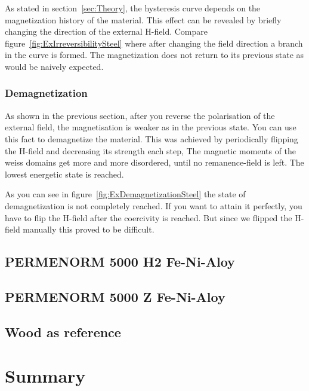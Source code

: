 \documentclass[a4paper,10pt,twocolumn]{article}
\begin{document}
    
    As stated in section~\ref{sec:Theory}, the hysteresis curve depends on the magnetization history
    of the material. 
    This effect can be revealed by briefly changing the direction of the external H-field.
    Compare figure~\ref{fig:ExIrreversibilitySteel} where after changing the field direction a branch in the curve
    is formed.
    The magnetization does not return to its previous state as would be naively expected.
    
    \subsubsection*{Demagnetization}
    
    \figExDemagnetizationSteel{}
    
    As shown in the previous section, after you reverse the polarisation of the external field, the magnetisation
    is weaker as in the previous state.
    You can use this fact to demagnetize the material.
    This was achieved by periodically flipping the H-field and decreasing its strength each step,
    The magnetic moments of the weiss domains get more and more disordered, until no remanence-field is left.
    The lowest energetic state is reached.
    
    As you can see in figure~\ref{fig:ExDemagnetizationSteel} the state of demagnetization is not
    completely reached.
    If you want to attain it perfectly, you have to flip the H-field after the coercivity is reached.
    But since we flipped the H-field manually this proved to be difficult. 
    
    \subsection{PERMENORM 5000 H2 Fe-Ni-Aloy}
    
    
    
    \subsection{PERMENORM 5000 Z Fe-Ni-Aloy}
    \subsection{Wood as reference}
    \section{Summary}
    
    
    \begin{thebibliography}{}    %
        
    \end{thebibliography}
    
\end{document}

